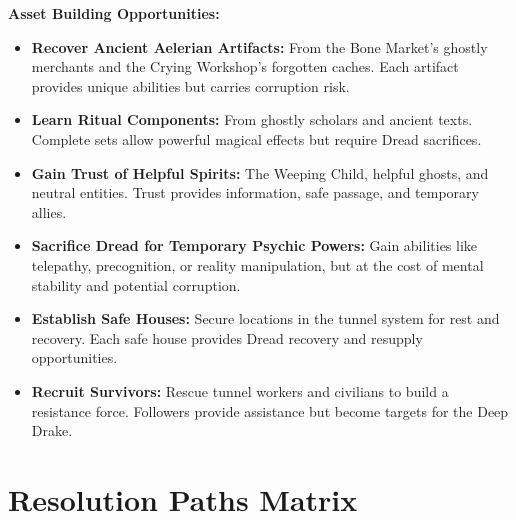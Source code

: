 \documentclass[11pt]{article}
\begin{document}
\textbf{Asset Building Opportunities:}
\begin{itemize}
\item \textbf{Recover Ancient Aelerian Artifacts:} From the Bone Market's ghostly merchants and the Crying Workshop's forgotten caches. Each artifact provides unique abilities but carries corruption risk.
\item \textbf{Learn Ritual Components:} From ghostly scholars and ancient texts. Complete sets allow powerful magical effects but require Dread sacrifices.
\item \textbf{Gain Trust of Helpful Spirits:} The Weeping Child, helpful ghosts, and neutral entities. Trust provides information, safe passage, and temporary allies.
\item \textbf{Sacrifice Dread for Temporary Psychic Powers:} Gain abilities like telepathy, precognition, or reality manipulation, but at the cost of mental stability and potential corruption.
\item \textbf{Establish Safe Houses:} Secure locations in the tunnel system for rest and recovery. Each safe house provides Dread recovery and resupply opportunities.
\item \textbf{Recruit Survivors:} Rescue tunnel workers and civilians to build a resistance force. Followers provide assistance but become targets for the Deep Drake.
\end{itemize}

\section{Resolution Paths Matrix}
\end{document}
